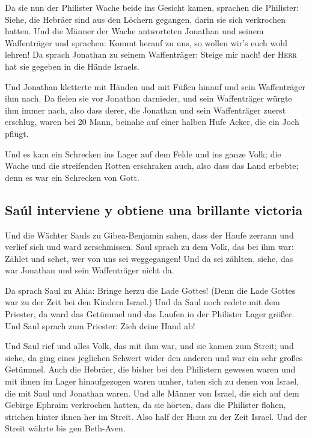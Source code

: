  Da sie nun der Philister Wache beide ins Gesicht kamen,
sprachen die Philister: Siehe, die Hebräer sind aus den Löchern
gegangen, darin sie sich verkrochen hatten.  Und die
Männer der Wache antworteten Jonathan und seinem Waffenträger und
sprachen: Kommt herauf zu uns, so wollen wir's euch wohl lehren! Da
sprach Jonathan zu seinem Waffenträger: Steige mir nach! der
\textsc{Herr} hat sie gegeben in die Hände Israels.

 Und Jonathan kletterte mit Händen und mit Füßen hinauf
und sein Waffenträger ihm nach. Da fielen sie vor Jonathan darnieder,
und sein Waffenträger würgte ihm immer nach,  also dass
derer, die Jonathan und sein Waffenträger zuerst erschlug, waren bei 20
Mann, beinahe auf einer halben Hufe Acker, die ein Joch pflügt.

 Und es kam ein Schrecken ins Lager auf dem Felde und ins
ganze Volk; die Wache und die streifenden Rotten erschraken auch, also
dass das Land erbebte; denn es war ein Schrecken von Gott.

\hypertarget{sauxfal-interviene-y-obtiene-una-brillante-victoria}{%
\subsection{Saúl interviene y obtiene una brillante
victoria}\label{sauxfal-interviene-y-obtiene-una-brillante-victoria}}

 Und die Wächter Sauls zu Gibea-Benjamin sahen, dass der
Haufe zerrann und verlief sich und ward zerschmissen. 
Saul sprach zu dem Volk, das bei ihm war: Zählet und sehet, wer von uns
sei weggegangen! Und da sei zählten, siehe, das war Jonathan und sein
Waffenträger nicht da.

 Da sprach Saul zu Ahia: Bringe herzu die Lade Gottes!
(Denn die Lade Gottes war zu der Zeit bei den Kindern Israel.)
 Und da Saul noch redete mit dem Priester, da ward das
Getümmel und das Laufen in der Philister Lager größer. Und Saul sprach
zum Priester: Zieh deine Hand ab!

 Und Saul rief und alles Volk, das mit ihm war, und sie
kamen zum Streit; und siehe, da ging eines jeglichen Schwert wider den
anderen und war ein sehr großes Getümmel.  Auch die
Hebräer, die bisher bei den Philistern gewesen waren und mit ihnen im
Lager hinaufgezogen waren umher, taten sich zu denen von Israel, die mit
Saul und Jonathan waren.  Und alle Männer von Israel, die
sich auf dem Gebirge Ephraim verkrochen hatten, da sie hörten, dass die
Philister flohen, strichen hinter ihnen her im Streit. 
Also half der \textsc{Herr} zu der Zeit Israel. Und der Streit währte
bis gen Beth-Aven.

